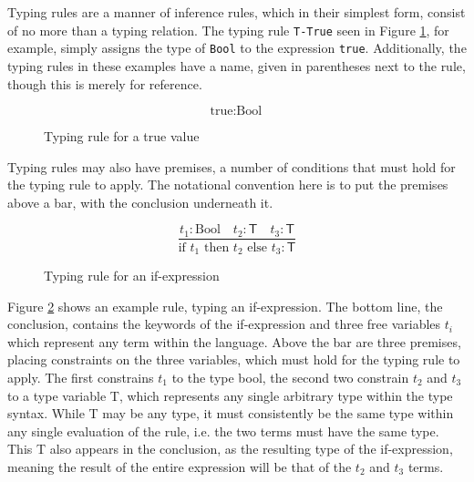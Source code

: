 \documentclass[nofilelist]{cslthse-msc}
\newcommand{\CR}[1]{\textcolor{green!60!black}{[\textbf{CR}:#1]}}
\begin{document}
Typing rules are a manner of inference rules, which in their simplest form, consist of no more than a typing relation.
The typing rule \lstinline{T-True} seen in Figure \ref{typingruleexampletrue}, for example, simply assigns the type of \lstinline{Bool} to the expression \lstinline{true}.
Additionally, the typing rules in these examples have a name, given in parentheses next to the rule, though this is merely for reference.

\begin{figure}[h]
  \begin{equation}
    \tag{T-True}
    \text{true} : \text{Bool}
  \end{equation}
  \caption{Typing rule for a true value}
  \label{typingruleexampletrue}
\end{figure}

Typing rules may also have premises, a number of conditions that must hold for the typing rule to apply.
The notational convention here is to put the premises above a bar, with the conclusion underneath it.

\begin{figure}[h]
  \begin{equation}
    \tag{T-If}
    \frac{
      t_1 : \text{Bool}\quad
      t_2 : \textsf{T}\quad
      t_3 : \textsf{T}
    }{
      \text{if } t_1 \text{ then } t_2 \text{ else } t_3 : \textsf{T}
    }
  \end{equation}
  \caption{Typing rule for an if-expression}
  \label{typingruleexampleif}
\end{figure}

\newcommand{\ty}[1]{\textcolor{blue!20!black}{\textsf{#1}}}
\newcommand{\tyvar}[1]{\textsf{#1}}
Figure \ref{typingruleexampleif} shows an example rule, typing an if-expression.
The bottom line, the conclusion, contains the keywords of the if-expression and three free variables $t_i$ which represent any term within the language.
Above the bar are three premises, placing constraints on the three variables, which must hold for the typing rule to apply.
The first constrains $t_1$ to the type bool, the second two constrain $t_2$ and $t_3$ to a type variable \tyvar{T}, which represents any single arbitrary type within the type syntax.
While \tyvar{T} may be any type, it must consistently be the same type within any single evaluation of the rule, i.e. the two terms must have the same type.
This \tyvar{T} also appears in the conclusion, as the resulting type of the if-expression, meaning the result of the entire expression will be that of the $t_2$ and $t_3$ terms.
\end{document}
